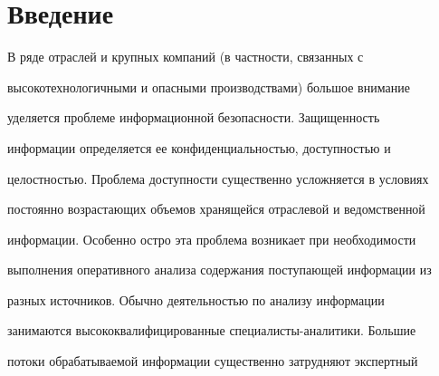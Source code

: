 \vspace*{-2pt}






\vspace*{-4pt}








      \thispagestyle{headings}



      

            \label{st\stat}

            

            \vspace*{-12pt}



\section{Введение}

     

     В ряде отраслей и крупных компаний (в частности, связанных с 

высокотехнологичными и опасными производствами) большое внимание 

уделяется проблеме информационной безопасности. Защищенность 

информации определяется ее конфиденциальностью, доступностью и 

целостностью. Проблема доступности существенно усложняется в условиях 

постоянно возрастающих объемов хранящейся отраслевой и ведомственной 

информации. Особенно остро эта проблема возникает при необходимости 

выполнения оперативного анализа содержания поступающей информации из 

разных источников. Обычно деятельностью по анализу информации 

занимаются высококвалифицированные специалисты-аналитики. Большие 

потоки обрабатываемой информации существенно затрудняют экспертный 

